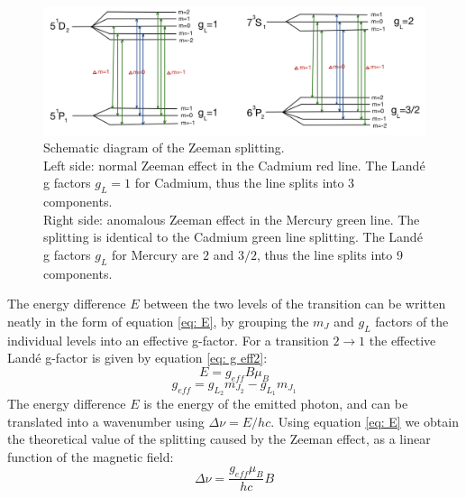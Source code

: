 \documentclass[11pt]{article}
\begin{document}
\begin{figure}[h!]
    \centering
    \includegraphics[width=\linewidth]{Energy levels.png}
    \captionsetup{justification=centering}
    \caption{Schematic diagram of the Zeeman splitting. \\
    Left side: normal Zeeman effect in the Cadmium red line. The Landé g factors $g_L = 1$ for Cadmium, thus the line splits into 3 components. \\
    Right side: anomalous Zeeman effect in the Mercury green line. The splitting is identical to the Cadmium green line splitting. The Landé g factors $g_L$ for Mercury are $2$ and $3/2$, thus the line splits into 9 components. }
    \label{fig: energy levels}
\end{figure}
The energy difference $E$ between the two levels of the transition can be written neatly in the form of equation \eqref{eq: E}, by grouping the $m_J$ and $g_L$ factors of the individual levels into an effective g-factor. For a transition $2 \rightarrow 1$ the effective Landé g-factor is given by equation \eqref{eq: g eff2}: 
\begin{equation}
    E = g_{eff} B \mu_B \label{eq: E}
\end{equation}
\begin{equation}
    g_{eff} = g_{L_2} m_{J_2} - g_{L_1} m_{J_1} \label{eq: g eff2}
\end{equation}
The energy difference $E$ is the energy of the emitted photon, and can be translated into a wavenumber using $\Delta \nu = E / hc$. Using equation \eqref{eq: E} we obtain the theoretical value of the splitting caused by the Zeeman effect, as a linear function of the magnetic field: 
\begin{equation}
    \Delta \nu = \frac{g_{eff} \mu_B}{hc} B
\end{equation}
\end{document}
